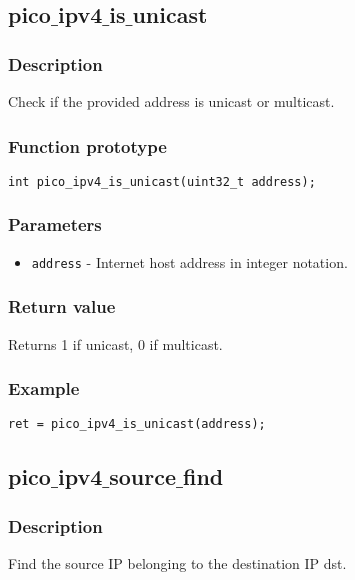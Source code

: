 \subsection{pico$\_$ipv4$\_$is$\_$unicast}

\subsubsection*{Description}
Check if the provided address is unicast or multicast.

\subsubsection*{Function prototype}
\begin{verbatim}
int pico_ipv4_is_unicast(uint32_t address);
\end{verbatim}

\subsubsection*{Parameters}
\begin{itemize}[noitemsep]
\item \texttt{address} - Internet host address in integer notation.
\end{itemize}

\subsubsection*{Return value}
Returns 1 if unicast, 0 if multicast.


\subsubsection*{Example}
\begin{verbatim}
ret = pico_ipv4_is_unicast(address);
\end{verbatim}



\subsection{pico$\_$ipv4$\_$source$\_$find}

\subsubsection*{Description}
Find the source IP belonging to the destination IP dst.

